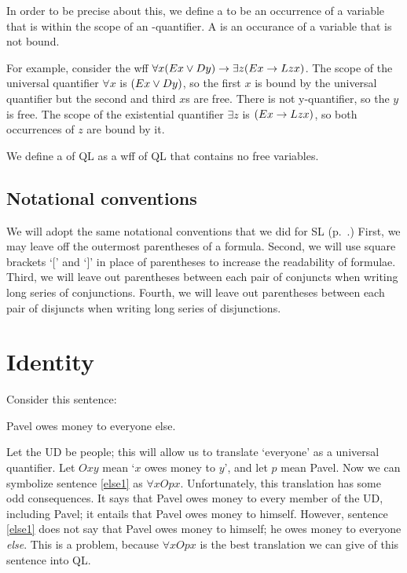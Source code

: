 In order to be precise about this, we define a  to be an occurrence of a variable  that is within the scope of an -quantifier. A  is an occurance of a variable that is not bound.

For example, consider the wff $\forall x(Ex \vee Dy) \rightarrow \exists z(Ex \rightarrow Lzx)$. The scope of the universal quantifier $\forall x$ is $(Ex \vee Dy)$, so the first $x$ is bound by the universal quantifier but the second and third $x$s are free. There is not y-quantifier, so the $y$ is free. The scope of the existential quantifier $\exists z$ is $(Ex \rightarrow Lzx)$, so both occurrences of $z$ are bound by it.

We define a  of QL as a wff of QL that contains no free variables.



\subsection{Notational conventions}

We will adopt the same notational conventions that we did for SL (p.~\pageref{SLconventions}.) First, we may leave off the outermost parentheses of a formula. Second, we will use square brackets `[' and `]' in place of parentheses to increase the readability of formulae. Third, we will leave out parentheses between each pair of conjuncts when writing long series of conjunctions. Fourth, we will leave out parentheses between each pair of disjuncts when writing long series of disjunctions.


\section{Identity}
\label{sec.identity}

Consider this sentence:
\begin{earg}
\item[\ex{else1}] Pavel owes money to everyone else.
\end{earg}
Let the UD be people; this will allow us to translate `everyone' as a universal quantifier. Let $Oxy$ mean `$x$ owes money to $y$', and let $p$ mean Pavel. Now we can symbolize sentence \ref{else1} as $\forall x Opx$. Unfortunately, this translation has some odd consequences. It says that Pavel owes money to every member of the UD, including Pavel; it entails that Pavel owes money to himself. However, sentence \ref{else1} does not say that Pavel owes money to himself; he owes money to everyone \emph{else}. This is a problem, because $\forall x Opx$ is the best translation we can give of this sentence into QL.


